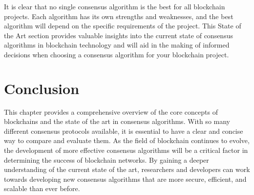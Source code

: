 It is clear that no single consensus algorithm is the best for all blockchain projects. Each algorithm has its own strengths and weaknesses, and the best algorithm will depend on the specific requirements of the project. This State of the Art section provides valuable insights into the current state of consensus algorithms in blockchain technology and will aid in the making of informed decisions when choosing a consensus algorithm for your blockchain project.

\section{Conclusion}
This chapter provides a comprehensive overview of the core concepts of blockchains and the state of the art in consensus algorithms. With so many different consensus protocols available, it is essential to have a clear and concise way to compare and evaluate them. As the field of blockchain continues to evolve, the development of more effective consensus algorithms will be a critical factor in determining the success of blockchain networks. By gaining a deeper understanding of the current state of the art, researchers and developers can work towards developing new consensus algorithms that are more secure, efficient, and scalable than ever before.

